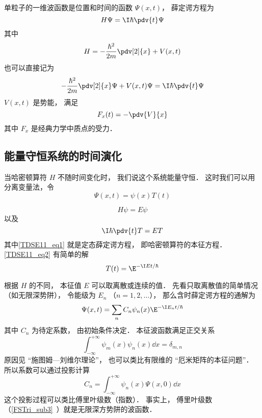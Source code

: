 
\begin{issues}
\issueDraft
\end{issues}


单粒子的一维波函数是位置和时间的函数 $\Psi(x, t)$， 薛定谔方程为
\begin{equation}
H\Psi = \I\hbar \pdv{t}\Psi
\end{equation}
其中
\begin{equation}
H = -\frac{\hbar^2}{2m}\pdv[2]{x} + V(x, t)
\end{equation}
也可以直接记为
\begin{equation}\label{TDSE11_eq3}
-\frac{\hbar^2}{2m}\pdv[2]{x}\Psi + V(x, t)\Psi = \I\hbar \pdv{t}\Psi
\end{equation}
$V(x,t)$ 是势能， 满足
\begin{equation}
F_x(t) = -\pdv{V}{x}
\end{equation}
其中 $F_x$ 是经典力学中质点的受力．

\subsection{能量守恒系统的时间演化}
当哈密顿算符 $H$ 不随时间变化时， 我们说这个系统能量守恒． 这时我们可以用分离变量法，令
\begin{equation}
\Psi(x, t) = \psi(x) T(t)
\end{equation}
 
\begin{equation}\label{TDSE11_eq1}
H\psi = E\psi
\end{equation}
以及
\begin{equation}\label{TDSE11_eq2}
\I \hbar\pdv{t}T = ET
\end{equation}
其中\autoref{TDSE11_eq1} 就是定态薛定谔方程， 即哈密顿算符的本征方程． \autoref{TDSE11_eq2} 有简单的解
\begin{equation}
T(t) = \E^{-\I E t/\hbar}
\end{equation}

根据 $H$ 的不同， 本征值 $E$ 可以取离散或连续的值． 先看只取离散值的简单情况（如无限深势阱）， 令能级为 $E_n$ （$n = 1, 2, \dots$）， 那么含时薛定谔方程的通解为
\begin{equation}\label{TDSE11_eq5}
\Psi(x, t) = \sum_n C_n \psi_n(x) \E^{-\I E_n t/\hbar}
\end{equation}
其中 $C_n$ 为待定系数， 由初始条件决定． 本征波函数满足正交关系
\begin{equation}
\int_{-\infty}^{+\infty}\psi_m(x)\psi_n(x)\dd{x} = \delta_{m,n}
\end{equation}
原因见 “施图姆—刘维尔理论”， 也可以类比有限维的 “厄米矩阵的本征问题”． 所以系数可以通过投影计算
\begin{equation}
C_n = \int_{-\infty}^{+\infty} \psi_n(x)\Psi(x, 0) \dd{x}
\end{equation}
这个投影过程可以类比傅里叶级数（指数）． 事实上， 傅里叶级数（\autoref{FSTri_sub3}~）就是无限深方势阱的波函数．

